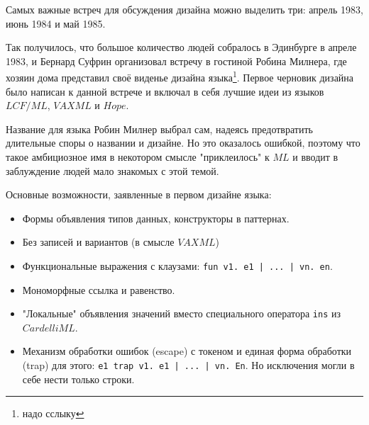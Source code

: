 \documentclass[14pt]{matmex-diploma-custom}
\begin{document}
Самых важные встреч для обсуждения дизайна можно выделить три: апрель 1983, июнь 1984 и май 1985. 

Так получилось, что большое количество людей собралось в Эдинбурге в апреле 1983, и Бернард Суфрин организовал встречу в гостиной Робина Милнера, где хозяин дома представил своё виденье дизайна языка\footnote{надо сслыку}. Первое черновик дизайна было написан к данной встрече и включал в себя лучшие идеи из языков $LCF/ML$, $VAX ML$ и $Hope$. 


Название для языка Робин Милнер выбрал сам, надеясь предотвратить длительные споры о названии и дизайне. Но это оказалось ошибкой, поэтому что такое амбициозное имя в некотором смысле "приклеилось" к $ML$ и вводит в заблуждение людей мало знакомых с этой темой.

Основные возможности, заявленные в первом дизайне языка:
\begin{itemize}
\item Формы объявления типов данных, конструкторы в паттернах.
\item Без записей и вариантов (в смысле $VAX ML$)
\item Функциональные выражения с клаузами: \verb=fun v1. e1 | ... | vn. en=.
\item Мономорфные ссылка и равенство.
\item "Локальные" объявления значений вместо специального оператора \verb=ins= из $Cardelli ML$.
\item Механизм обработки ошибок (escape) с токеном и единая форма обработки (trap) для этого: \verb=e1 trap v1. e1 | ... | vn. En=. Но исключения могли в себе нести только строки.
\end{itemize}
%
\end{document}
